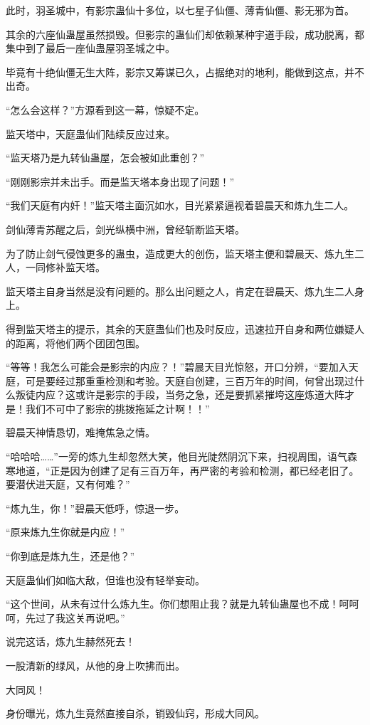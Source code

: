 \begin{this_body}
此时，羽圣城中，有影宗蛊仙十多位，以七星子仙僵、薄青仙僵、影无邪为首。

其余的六座仙蛊屋虽然损毁。但影宗的蛊仙们却依赖某种宇道手段，成功脱离，都集中到了最后一座仙蛊屋羽圣城之中。

毕竟有十绝仙僵无生大阵，影宗又筹谋已久，占据绝对的地利，能做到这点，并不出奇。

“怎么会这样？”方源看到这一幕，惊疑不定。

监天塔中，天庭蛊仙们陆续反应过来。

“监天塔乃是九转仙蛊屋，怎会被如此重创？”

“刚刚影宗并未出手。而是监天塔本身出现了问题！”

“我们天庭有内奸！”监天塔主面沉如水，目光紧紧逼视着碧晨天和炼九生二人。

剑仙薄青苏醒之后，剑光纵横中洲，曾经斩断监天塔。

为了防止剑气侵蚀更多的蛊虫，造成更大的创伤，监天塔主便和碧晨天、炼九生二人，一同修补监天塔。

监天塔主自身当然是没有问题的。那么出问题之人，肯定在碧晨天、炼九生二人身上。

得到监天塔主的提示，其余的天庭蛊仙们也及时反应，迅速拉开自身和两位嫌疑人的距离，将他们两个团团包围。

“等等！我怎么可能会是影宗的内应？！”碧晨天目光惊怒，开口分辨，“要加入天庭，可是要经过那重重检测和考验。天庭自创建，三百万年的时间，何曾出现过什么叛徒内应？这或许是影宗的手段，当务之急，还是要抓紧摧垮这座炼道大阵才是！我们不可中了影宗的挑拨拖延之计啊！！”

碧晨天神情恳切，难掩焦急之情。

“哈哈哈……”一旁的炼九生却忽然大笑，他目光陡然阴沉下来，扫视周围，语气森寒地道，“正是因为创建了足有三百万年，再严密的考验和检测，都已经老旧了。要潜伏进天庭，又有何难？”

“炼九生，你！”碧晨天低呼，惊退一步。

“原来炼九生你就是内应！”

“你到底是炼九生，还是他？”

天庭蛊仙们如临大敌，但谁也没有轻举妄动。

“这个世间，从未有过什么炼九生。你们想阻止我？就是九转仙蛊屋也不成！呵呵呵，先过了我这关再说吧。”

说完这话，炼九生赫然死去！

一股清新的绿风，从他的身上吹拂而出。

大同风！

身份曝光，炼九生竟然直接自杀，销毁仙窍，形成大同风。


\end{this_body}
